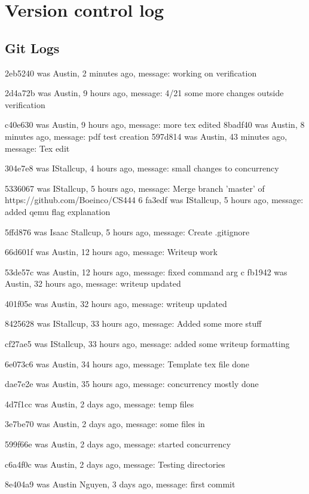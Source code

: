 \documentclass[letterpaper,10pt,titlepage]{article}
\begin{document}
\section{Version control log}
\begin{versionhistory}
\subsection{Git Logs}
2eb5240 was Austin, 2 minutes ago, message: working on verification

2d4a72b was Austin, 9 hours ago, message: 4/21 some more changes outside verification

c40e630 was Austin, 9 hours ago, message: more tex edited
8badf40 was Austin, 8 minutes ago, message: pdf test creation
597d814 was Austin, 43 minutes ago, message: Tex edit

304e7e8 was IStallcup, 4 hours ago, message: small changes to concurrency

5336067 was IStallcup, 5 hours ago, message: Merge branch 'master' of https://github.com/Boeinco/CS444
6
fa3edf was IStallcup, 5 hours ago, message: added qemu flag explanation

5ffd876 was Isaac Stallcup, 5 hours ago, message: Create .gitignore

66d601f was Austin, 12 hours ago, message: Writeup work

53de57c was Austin, 12 hours ago, message: fixed command arg
c
fb1942 was Austin, 32 hours ago, message: writeup updated

401f05e was Austin, 32 hours ago, message: writeup updated

8425628 was IStallcup, 33 hours ago, message: Added some more stuff

cf27ae5 was IStallcup, 33 hours ago, message: added some writeup formatting

6e073c6 was Austin, 34 hours ago, message: Template tex file done

dae7e2e was Austin, 35 hours ago, message: concurrency mostly done

4d7f1cc was Austin, 2 days ago, message: temp files

3e7be70 was Austin, 2 days ago, message: some files in

599f66e was Austin, 2 days ago, message: started concurrency

c6a4f0c was Austin, 2 days ago, message: Testing directories

8e404a9 was Austin Nguyen, 3 days ago, message: first commit

\end{versionhistory}
\end{document}
